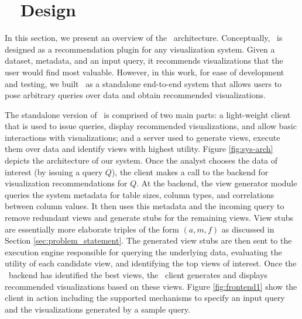 

\section{{\large \SeeDB\ } Design}
\label{sec:system_architecture}

In this section, we present an overview of the \SeeDB\ architecture.
Conceptually, \SeeDB\ is designed as a recommendation plugin for any 
visualization system. Given a dataset, metadata, and an input query, 
it recommends visualizations that the user would find most valuable.
However, in this work, for ease of development and testing, we built 
\SeeDB\ as a standalone end-to-end system that allows users to pose 
arbitrary queries over data and obtain recommended visualizations.

The standalone version of \SeeDB\ is comprised of two main parts: 
a light-weight client that is 
used to issue queries, display recommended visualizations, and allow basic 
interactions with visualizations; and a server used to generate views, execute
them over data and identify views with highest utility. 
Figure \ref{fig:sys-arch} depicts the architecture of our system.
Once the analyst chooses the data of interest (by issuing a query $Q$), the
client makes a call to the backend for visualization recommendations for $Q$.
At the backend, the view generator module queries the system metadata for table sizes, 
column types, and correlations between column values. 
It then uses this metadata and the incoming query to remove redundant views and generate stubs for the remaining views. 
View stubs are essentially more elaborate triples of the form $(a, m, f)$ as
discussed in Section \ref{sec:problem_statement}. 
The generated view stubs are then sent to the execution engine
responsible for querying the underlying data, evaluating the utility of each
candidate view, and identifying the top views of interest. 
Once the \SeeDB\ backend has identified the best views, the \SeeDB\
client generates and displays recommended visualizations based on these views.
Figure \ref{fig:frontend1} show the \SeeDB client in action including the supported mechanisms to specify an input query and the visualizations generated by a sample query. 

